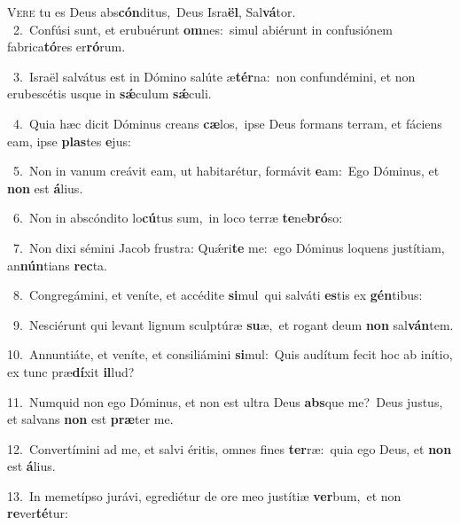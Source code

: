 \lettrine{\initial\textcolor{\initialcolor}{V}}{ere} tu es Deus abs\-\textbf{cón}\-ditus,~\star Deus Isra\-\textbf{ël}\-, Sal\-\textbf{vá}\-tor.\\
{\numbfont\textcolor{\numbcolor}{~2.}}~Confúsi sunt, et erubuérunt \textbf{om}\-nes:~\star simul abiérunt in confusiónem fabrica\-\textbf{tó}\-res er\-\textbf{ró}\-rum.\par
{\numbfont\textcolor{\numbcolor}{~3.}}~Israël salvátus est in Dómino salúte æ\-\textbf{tér}\-na:~\star non confundémini, et non erubescétis usque in \textbf{sǽ}\-culum \textbf{sǽ}\-culi.\par
{\numbfont\textcolor{\numbcolor}{~4.}}~Quia hæc dicit Dóminus creans \textbf{cæ}\-los,~\star ipse Deus formans terram, et fáciens eam, ipse \textbf{plas}\-tes \textbf{e}\-jus:\par
{\numbfont\textcolor{\numbcolor}{~5.}}~Non in vanum creávit eam, ut habitarétur, formávit \textbf{e}\-am:~\star Ego Dóminus, et \textbf{non} est \textbf{á}\-lius.\par
{\numbfont\textcolor{\numbcolor}{~6.}}~Non in abscóndito lo\-\textbf{cú}\-tus sum,~\star in loco terræ \textbf{te}\-ne\-\textbf{bró}\-so:\par
{\numbfont\textcolor{\numbcolor}{~7.}}~Non dixi sémini Jacob frustra: Quǽri\textbf{te} me:~\star ego Dóminus loquens justítiam, an\-\textbf{nún}\-tians \textbf{rec}\-ta.\par
{\numbfont\textcolor{\numbcolor}{~8.}}~Congregámini, et veníte, et accédite \textbf{si}\-mul~\star qui salváti \textbf{es}\-tis ex \textbf{gén}\-tibus:\par
{\numbfont\textcolor{\numbcolor}{~9.}}~Nesciérunt qui levant lignum sculptúræ \textbf{su}\-æ,~\star et rogant deum \textbf{non} sal\-\textbf{ván}\-tem.\par
{\numbfont\textcolor{\numbcolor}{10.}}~Annuntiáte, et veníte, et consiliámini \textbf{si}\-mul:~\star Quis audítum fecit hoc ab inítio, ex tunc præ\-\textbf{dí}\-xit \textbf{il}\-lud?\par
{\numbfont\textcolor{\numbcolor}{11.}}~Numquid non ego Dóminus, et non est ultra Deus \textbf{abs}\-que me?~\star Deus justus, et salvans \textbf{non} est \textbf{præ}\-ter me.\par
{\numbfont\textcolor{\numbcolor}{12.}}~Convertímini ad me, et salvi éritis, omnes fines \textbf{ter}\-ræ:~\star quia ego Deus, et \textbf{non} est \textbf{á}\-lius.\par
{\numbfont\textcolor{\numbcolor}{13.}}~In memetípso jurávi, egrediétur de ore meo justítiæ \textbf{ver}\-bum,~\star et non \textbf{re}\-ver\-\textbf{té}\-tur:\par
